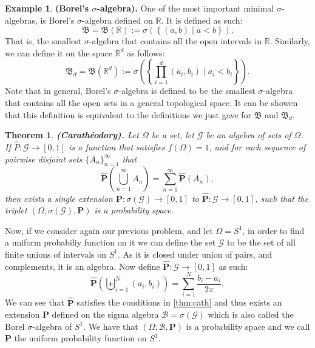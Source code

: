 \documentclass[11pt,a4paper]{article}
\theoremstyle{definition}
\newtheorem{example}{Example}[section]
\theoremstyle{plain}
\newtheorem{theorem}{Theorem}[section]
\newcommand{\R}{\mathbb{R}}
\newcommand{\Prob}{\mathbf{P}}
\newcommand{\set}[2]{ \left\{ #1 \mid #2 \right\} }
\renewcommand{\tt}[1]{\textnormal{\textbf{(#1).}}} %
\begin{document}
  \begin{example}
    \tt{Borel's $\sigma$-algebra}
    One of the most important minimal $\sigma$-algebras, is Borel's 
    $\sigma$-algebra defined on $\R$. It is defined as such:
    \[
      \mathfrak B = \mathfrak B(\R) := \sigma(\set{(a,b)}{a < b}).
    \]
    That is, the smallest $\sigma$-algebra that contains all the open 
    intervals in $\R$. Similarly, we can define it on the space $\R^d$
    as follows:
    \[
      \mathfrak B_d = \mathfrak B(\R^d) := 
      \sigma\left(\set{\prod_{i=1}^{d}(a_i,b_i)}{a_i < b_i}\right).
    \]
    Note that in general, Borel's $\sigma$-algebra is defined to be
    the smallest $\sigma$-algebra that contains all the open sets in a
    general topological space. It can be showen that this definition is
    equivalent to the definitions we just gave for $\mathfrak B$ and
    $\mathfrak B_d$.
  \end{example}

  \begin{theorem}\label{thm:cath}
    \tt{Carath\'eodory}
    Let $\Omega$ be a set, let $\mathcal G$ be an algebra of sets of $\Omega$.
    If $\widehat{P} \colon \mathcal G \to [0,1]$ is a function that satisfies
    $f(\Omega) = 1$, and for each sequence of pairwise disjoint sets
    $\{A_n\}_{n=1}^{\infty}$ that
      \[
        \widehat{\Prob} \left(\bigcup_{n=1}^{\infty}{A_n}\right) = 
        \sum_{n=1}^{\infty}{\widehat{\Prob}(A_n)},
      \]
    then exists a single extension 
    $\Prob \colon \sigma(\mathcal G) \to [0,1]$ to 
    $\widehat{\Prob} \colon \mathcal G \to [0,1]$, such that the triplet
    $(\Omega, \sigma(\mathcal G), \Prob)$ is a probability space.
  \end{theorem}

  Now, if we consider again our previous problem, and let $\Omega = S^1$,
  in order to find a uniform probabiliy function on it we can define the
  set $\mathcal G$ to be the set of all finite unions of intervals on $S^1$.
  As it is closed under union of pairs, and complements, it is an algebra.
  Now define $\widehat{\Prob} \colon \mathcal G \to [0,1]$ as such:
  \[
    \widehat{\Prob}\left(\biguplus_{i=1}^{N}\left(a_{i},b_{i}\right)\right)
    = \sum_{i=1}^{N}\frac{b_{i}-a_{i}}{2\pi},
  \]
  We can see that $\widehat{\Prob}$ satisfies the conditions in 
  \autoref{thm:cath} and thus exists an extension $\Prob$ defined on
  the sigma algebra $\mathcal B = \sigma(\mathcal G)$ which is also called
  the Borel $\sigma$-algebra of $S^1$. We have that 
  $(\Omega, \mathcal B, \Prob)$ is a probability space and we call 
  $\Prob$ the uniform probability function on $S^1$.
\end{document}
